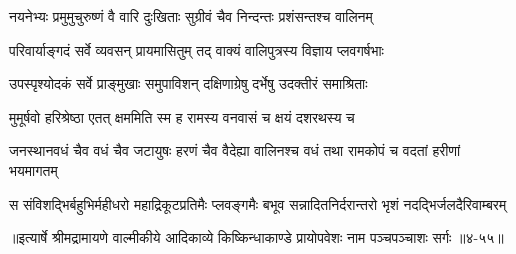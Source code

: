 \twolineshloka
{नयनेभ्यः प्रमुमुचुरुष्णं वै वारि दुःखिताः}
{सुग्रीवं चैव निन्दन्तः प्रशंसन्तश्च वालिनम्} %

\twolineshloka
{परिवार्याङ्गदं सर्वे व्यवसन् प्रायमासितुम्}
{तद् वाक्यं वालिपुत्रस्य विज्ञाय प्लवगर्षभाः} %

\twolineshloka
{उपस्पृश्योदकं सर्वे प्राङ्मुखाः समुपाविशन्}
{दक्षिणाग्रेषु दर्भेषु उदक्तीरं समाश्रिताः} %

\twolineshloka
{मुमूर्षवो हरिश्रेष्ठा एतत् क्षममिति स्म ह}
{रामस्य वनवासं च क्षयं दशरथस्य च} %

\threelineshloka
{जनस्थानवधं चैव वधं चैव जटायुषः}
{हरणं चैव वैदेह्या वालिनश्च वधं तथा}
{रामकोपं च वदतां हरीणां भयमागतम्} %

\twolineshloka
{स संविशद्भिर्बहुभिर्महीधरो महाद्रिकूटप्रतिमैः प्लवङ्गमैः}
{बभूव सन्नादितनिर्दरान्तरो भृशं नदद्भिर्जलदैरिवाम्बरम्} %


॥इत्यार्षे श्रीमद्रामायणे वाल्मीकीये आदिकाव्ये किष्किन्धाकाण्डे प्रायोपवेशः नाम पञ्चपञ्चाशः सर्गः ॥४-५५॥
